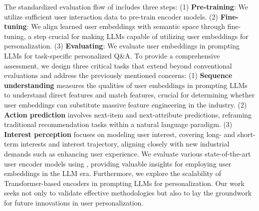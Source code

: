 The standardized evaluation flow of \name includes three steps: 
(1) \textbf{Pre-training}: We utilize sufficient user interaction data to pre-train encoder models. 
(2) \textbf{Fine-tuning}: We align learned user embeddings with semantic space through fine-tuning, a step crucial for making LLMs capable of utilizing user embeddings for personalization.
(3) \textbf{Evaluating}: We evaluate user embeddings in prompting LLMs for task-specific personalized Q\&A.  
To provide a comprehensive assessment, we design three critical tasks that extend beyond conventional evaluations and address the previously mentioned concerns:
(1) \textbf{Sequence understanding} measures the qualities of user embeddings in prompting LLMs to understand direct features and match features, crucial for determining whether user embeddings can substitute massive feature engineering in the industry.
(2) \textbf{Action prediction} involves next-item and next-attribute predictions, reframing traditional recommendation tasks within a natural language paradigm.
(3) \textbf{Interest perception} focuses on modeling user interest, covering long- and short-term interests and interest trajectory, aligning closely with new industrial demands such as enhancing user experience. 
We evaluate various state-of-the-art user encoder models using \name, providing valuable insights for employing user embeddings in the LLM era. Furthermore, we explore the scalability of Transformer-based encoders in prompting LLMs for personalization.
Our work seeks not only to validate effective methodologies but also to lay the groundwork for future innovations in user personalization.


